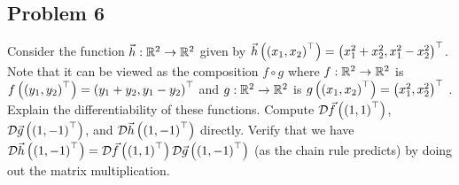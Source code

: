\documentclass[main.tex]{subfiles}
\begin{document}
\subsection{Problem 6}
\begin{claim}
    Consider the function $\vec{h} : \mathbb R^2 \to \mathbb R^2$ given by $\vec{h}\left( \left( x_1,x_2 \right)^\top \right) = \left( x_1^2 + x_2^2,x_1^2 - x_2^2 \right)^\top$. Note that it can be viewed as the composition $f \circ g$ where $f : \mathbb R^2 \to \mathbb R^2$ is $f\left( \left( y_1,y_2 \right)^\top \right) = \left( y_1 + y_2,y_1 - y_2 \right)^\top$ and $g : \mathbb R^2 \to \mathbb R^2$ is $g\left( \left( x_1,x_2 \right)^\top \right) = \left( x_1^2,x_2^2 \right)^\top$ . Explain the differentiability of these functions. Compute $\mathcal{D}\vec{f}\left( \left( 1,1 \right)^\top \right)$, $\mathcal{D}\vec{g}\left( \left( 1,-1 \right)^\top \right)$, and $\mathcal{D}\vec{h}\left( \left( 1,-1 \right)^\top \right)$ directly. Verify that we have $\mathcal{D}\vec{h}\left( \left( 1,-1 \right)^\top \right) = \mathcal{D}\vec{f}\left( \left( 1, 1 \right)^\top \right)\mathcal{D}\vec{g}\left( \left( 1,-1 \right)^\top \right)$ (as the chain rule predicts) by doing out the matrix multiplication.
\end{claim}
\end{document}
